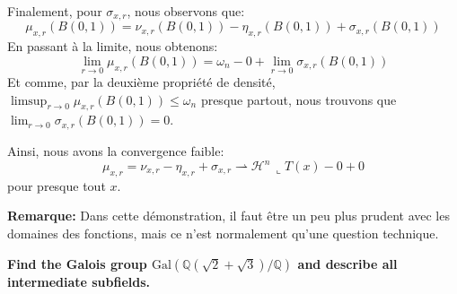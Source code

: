 \documentclass{article}
\begin{document}
\vspace{1ex}
Finalement, pour $\sigma_{x,r}$, nous observons que:
\[\mu_{x,r}(B(0,1))=\nu_{x,r}(B(0,1))-\eta_{x,r}(B(0,1))+\sigma_{x,r}(B(0,1))\]
En passant à la limite, nous obtenons:
\[\lim_{r\to 0}\mu_{x,r}(B(0,1))=\omega_n-0+\lim_{r\to 0}\sigma_{x,r}(B(0,1))\]
Et comme, par la deuxième propriété de densité, $\limsup_{r\to 0}\mu_{x,r}(B(0,1))
\le \omega_n$ presque partout, nous trouvons que $\lim_{r\to 0}\sigma_{x,r}(B(0,1))=0$.

Ainsi, nous avons la convergence faible:
\[\mu_{x,r}=\nu_{x,r}-\eta_{x,r}+\sigma_{x,r}\rightharpoonup\mathcal H^n\,\llcorner T(x)-0+0\]
pour presque tout $x$.

\vspace{1ex}
\textbf{Remarque:} Dans cette démonstration, il faut être un peu plus prudent
avec les domaines des fonctions, mais ce n'est normalement qu'une question
technique.

\vspace{10ex}
\textbf{Find the Galois group $\text{Gal}(\mathbb{Q}(\sqrt{2} + \sqrt{3})/\mathbb{Q})$ and describe all intermediate subfields.}
\end{document}
